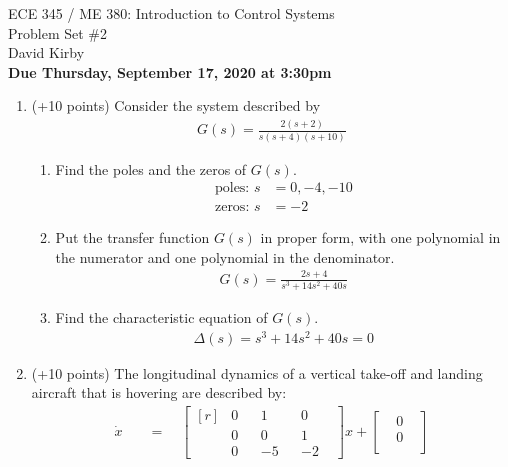 \documentclass[11pt]{article}
\begin{document}
 	\begin{center}
 	\LARGE{ECE 345 / ME 380: Introduction to Control Systems\\Problem Set \#2}\\[1.5em]
 	\large David Kirby\\[1.5em]
 	\large \textbf{Due Thursday, September 17, 2020 at 3:30pm}\\[2.5em]
 	\end{center}

\begin{enumerate}
    \item (+10 points) Consider the system described by
    \begin{align}
        G(s)=\frac{2(s+2)}{s(s+ 4)(s+ 10)}
    \end{align}
    \begin{enumerate}
        \item Find the poles and the zeros of \(G(s)\).
        \begin{align*}
            \text{poles: }s&=0,-4,-10\\
            \text{zeros: }s&=-2
        \end{align*}
        \item Put the transfer function \(G(s)\) in proper form, with one polynomial in the numerator and one polynomial in the denominator.
        \begin{align*}
            G(s)=\frac{2s+4}{s^3+14s^2+40s}
        \end{align*}
        \item Find the characteristic equation of \(G(s)\).
        \begin{align*}
            \Delta(s)=s^3+14s^2+40s=0
        \end{align*}
    \end{enumerate}
    \item (+10 points) The longitudinal dynamics of a vertical take-off and landing aircraft that is hovering are described by:
    \begin{align}
        \dot{x}\quad&=\quad
            \begin{bmatrix*}[r]
            &0 &&1 &&0&\\
            &0 &&0 &&1&\\
            &0 &&-5 &&-2&
            \end{bmatrix*}
            x+
            \begin{bmatrix*}
            &0 &\\
            &0 &\\

\end{bmatrix*}
\end{align}
\end{enumerate}
\end{document}
